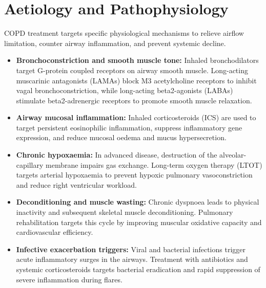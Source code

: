 \section*{Aetiology and Pathophysiology}
COPD treatment targets specific physiological mechanisms to relieve airflow limitation, counter airway inflammation, and prevent systemic decline.
\begin{itemize}
    \item \textbf{Bronchoconstriction and smooth muscle tone:} Inhaled bronchodilators target G-protein coupled receptors on airway smooth muscle. Long-acting muscarinic antagonists (LAMAs) block M3 acetylcholine receptors to inhibit vagal bronchoconstriction, while long-acting beta2-agonists (LABAs) stimulate beta2-adrenergic receptors to promote smooth muscle relaxation.
    \item \textbf{Airway mucosal inflammation:} Inhaled corticosteroids (ICS) are used to target persistent eosinophilic inflammation, suppress inflammatory gene expression, and reduce mucosal oedema and mucus hypersecretion.
    \item \textbf{Chronic hypoxaemia:} In advanced disease, destruction of the alveolar-capillary membrane impairs gas exchange. Long-term oxygen therapy (LTOT) targets arterial hypoxaemia to prevent hypoxic pulmonary vasoconstriction and reduce right ventricular workload.
    \item \textbf{Deconditioning and muscle wasting:} Chronic dyspnoea leads to physical inactivity and subsequent skeletal muscle deconditioning. Pulmonary rehabilitation targets this cycle by improving muscular oxidative capacity and cardiovascular efficiency.
    \item \textbf{Infective exacerbation triggers:} Viral and bacterial infections trigger acute inflammatory surges in the airways. Treatment with antibiotics and systemic corticosteroids targets bacterial eradication and rapid suppression of severe inflammation during flares.
\end{itemize}

